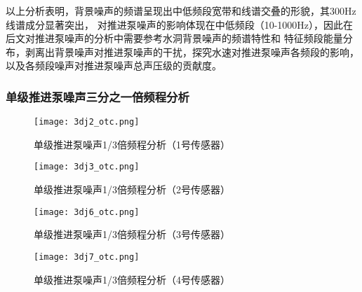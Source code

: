 以上分析表明，背景噪声的频谱呈现出中低频段宽带和线谱交叠的形貌，其300Hz线谱成分显著突出，
对推进泵噪声的影响体现在中低频段（10-1000Hz），因此在后文对推进泵噪声的分析中需要参考水洞背景噪声的频谱特性和
特征频段能量分布，剥离出背景噪声对推进泵噪声的干扰，探究水速对推进泵噪声各频段的影响，
以及各频段噪声对推进泵噪声总声压级的贡献度。
\subsubsection{单级推进泵噪声三分之一倍频程分析}
\begin{figure}[htbp]
    \centering
    \texttt{[image: 3dj2\_otc.png]}
    \caption{\label{fig:djotc1}单级推进泵噪声1/3倍频程分析（1号传感器）}
\end{figure}
\begin{figure}[htbp]
    \centering
    \texttt{[image: 3dj3\_otc.png]}
    \caption{\label{fig:djotc2}单级推进泵噪声1/3倍频程分析（2号传感器）}
\end{figure}
\begin{figure}[htbp]
    \centering
    \texttt{[image: 3dj6\_otc.png]}
    \caption{\label{fig:djotc3}单级推进泵噪声1/3倍频程分析（3号传感器）}
\end{figure}
\begin{figure}[htbp]
    \centering
    \texttt{[image: 3dj7\_otc.png]}
    \caption{\label{fig:djotc4}单级推进泵噪声1/3倍频程分析（4号传感器）}
\end{figure}


